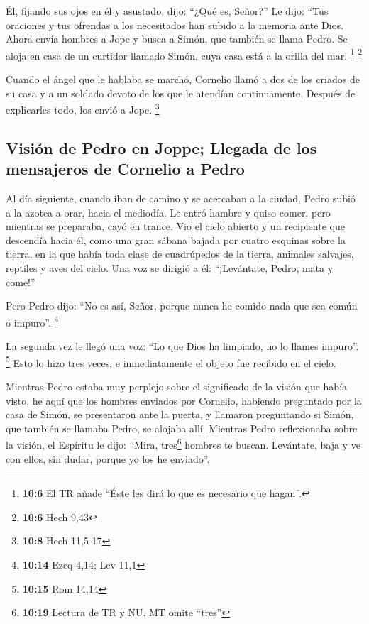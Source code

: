  Él, fijando sus ojos en él y asustado, dijo: ``¿Qué es,
Señor?'' Le dijo: ``Tus oraciones y tus ofrendas a los necesitados han
subido a la memoria ante Dios.  Ahora envía hombres a Jope
y busca a Simón, que también se llama Pedro.  Se aloja en
casa de un curtidor llamado Simón, cuya casa está a la orilla del mar.
\footnote{\textbf{10:6} El TR añade ``Éste les dirá lo que es necesario
  que hagan''.} \footnote{\textbf{10:6} Hech 9,43}

 Cuando el ángel que le hablaba se marchó, Cornelio llamó
a dos de los criados de su casa y a un soldado devoto de los que le
atendían continuamente.  Después de explicarles todo, los
envió a Jope. \footnote{\textbf{10:8} Hech 11,5-17}

\hypertarget{visiuxf3n-de-pedro-en-joppe-llegada-de-los-mensajeros-de-cornelio-a-pedro}{%
\subsection{Visión de Pedro en Joppe; Llegada de los mensajeros de
Cornelio a
Pedro}\label{visiuxf3n-de-pedro-en-joppe-llegada-de-los-mensajeros-de-cornelio-a-pedro}}

 Al día siguiente, cuando iban de camino y se acercaban a
la ciudad, Pedro subió a la azotea a orar, hacia el mediodía.
 Le entró hambre y quiso comer, pero mientras se
preparaba, cayó en trance.  Vio el cielo abierto y un
recipiente que descendía hacia él, como una gran sábana bajada por
cuatro esquinas sobre la tierra,  en la que había toda
clase de cuadrúpedos de la tierra, animales salvajes, reptiles y aves
del cielo.  Una voz se dirigió a él: ``¡Levántate, Pedro,
mata y come!''

 Pero Pedro dijo: ``No es así, Señor, porque nunca he
comido nada que sea común o impuro''. \footnote{\textbf{10:14} Ezeq
  4,14; Lev 11,1}

 La segunda vez le llegó una voz: ``Lo que Dios ha
limpiado, no lo llames impuro''. \footnote{\textbf{10:15} Rom 14,14}
 Esto lo hizo tres veces, e inmediatamente el objeto fue
recibido en el cielo.

 Mientras Pedro estaba muy perplejo sobre el significado
de la visión que había visto, he aquí que los hombres enviados por
Cornelio, habiendo preguntado por la casa de Simón, se presentaron ante
la puerta,  y llamaron preguntando si Simón, que también
se llamaba Pedro, se alojaba allí.  Mientras Pedro
reflexionaba sobre la visión, el Espíritu le dijo: ``Mira,
tres\footnote{\textbf{10:19} Lectura de TR y NU. MT omite ``tres''}
hombres te buscan.  Levántate, baja y ve con ellos, sin
dudar, porque yo los he enviado''.

